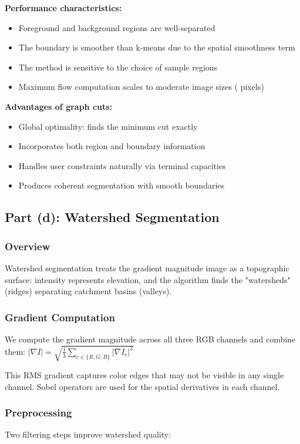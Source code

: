 \documentclass[11pt,a4paper]{article}
\begin{document}
\textbf{Performance characteristics:}
\begin{itemize}
    \item Foreground and background regions are well-separated
    \item The boundary is smoother than k-means due to the spatial smoothness term
    \item The method is sensitive to the choice of sample regions
    \item Maximum flow computation scales to moderate image sizes ( pixels)
\end{itemize}

\textbf{Advantages of graph cuts:}
\begin{itemize}
    \item Global optimality: finds the minimum cut exactly
    \item Incorporates both region and boundary information
    \item Handles user constraints naturally via terminal capacities
    \item Produces coherent segmentation with smooth boundaries
\end{itemize}

\subsection{Part (d): Watershed Segmentation }

\subsubsection{Overview}
Watershed segmentation treats the gradient magnitude image as a topographic surface: intensity represents elevation, and the algorithm finds the "watersheds" (ridges) separating catchment basins (valleys).

\subsubsection{Gradient Computation}
We compute the gradient magnitude across all three RGB channels and combine them:
$|\nabla I| = \sqrt{\frac{1}{3}\sum_{c \in \{R,G,B\}} |\nabla I_c|^2}$

This RMS gradient captures color edges that may not be visible in any single channel. Sobel operators are used for the spatial derivatives in each channel.

\subsubsection{Preprocessing}
Two filtering steps improve watershed quality:
\end{document}
